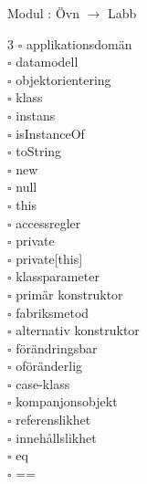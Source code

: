 
    Modul : Övn  $\rightarrow$ Labb 
    \begin{multicols}{3}\SlideFontTiny
    $\square$ applikationsdomän \\
$\square$ datamodell \\
$\square$ objektorientering \\
$\square$ klass \\
$\square$ instans \\
$\square$ isInstanceOf \\
$\square$ toString \\
$\square$ new \\
$\square$ null \\
$\square$ this \\
$\square$ accessregler \\
$\square$ private \\
$\square$ private[this] \\
$\square$ klassparameter \\
$\square$ primär konstruktor \\
$\square$ fabriksmetod \\
$\square$ alternativ konstruktor \\
$\square$ förändringsbar \\
$\square$ oföränderlig \\
$\square$ case-klass \\
$\square$ kompanjonsobjekt \\
$\square$ referenslikhet \\
$\square$ innehållslikhet \\
$\square$ eq \\
$\square$ == \\
    \end{multicols}
    